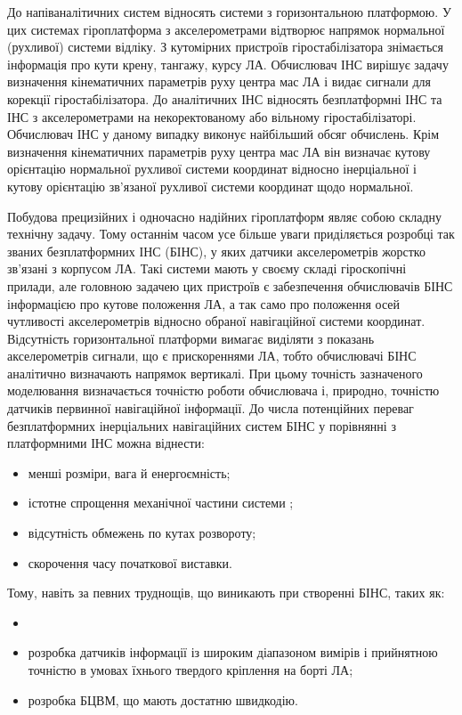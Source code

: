 До напіваналітичних систем відносять системи з горизонтальною платформою. У 
цих системах гіроплатформа з акселерометрами відтворює напрямок нормальної (рухливої) 
системи відліку. З кутомірних пристроїв гіростабілізатора знімається інформація про 
кути крену, тангажу, курсу ЛА. Обчислювач ІНС вирішує задачу визначення кінематичних 
параметрів руху центра мас ЛА і видає сигнали для корекції гіростабілізатора.
До аналітичних ІНС відносять безплатформні ІНС та ІНС з акселерометрами на некоректованому 
або вільному гіростабілізаторі. Обчислювач ІНС у даному випадку виконує найбільший обсяг 
обчислень. Крім визначення кінематичних параметрів руху центра мас ЛА він визначає кутову 
орієнтацію нормальної рухливої системи координат відносно інерціальної і кутову орієнтацію 
зв'язаної рухливої системи координат щодо нормальної. 

Побудова прецизійних і одночасно надійних гіроплатформ являє собою складну технічну задачу. 
Тому останнім часом усе більше уваги приділяється розробці так званих безплатформних ІНС (БІНС), 
у яких датчики акселерометрів жорстко зв’язані з корпусом ЛА. Такі системи мають у своєму складі 
гіроскопічні прилади, але головною задачею цих пристроїв є забезпечення обчислювачів БІНС 
інформацією про кутове положення ЛА, а так само про положення осей чутливості акселерометрів 
відносно обраної навігаційної системи координат. Відсутність горизонтальної платформи вимагає 
виділяти з показань акселерометрів сигнали, що є прискореннями ЛА, тобто обчислювачі БІНС 
аналітично визначають напрямок вертикалі. При цьому точність зазначеного моделювання 
визначається точністю роботи обчислювача і, природно, точністю датчиків первинної навігаційної інформації.
До числа потенційних переваг безплатформних інерціальних навігаційних систем БІНС у 
порівнянні з платформними ІНС можна віднести:

\begin{itemize}
 \item менші розміри, вага й енергоємність;
 \item істотне спрощення механічної частини системи ; 
 \item відсутність обмежень по кутах розвороту;
 \item скорочення часу початкової виставки.
\end{itemize}

Тому, навіть за певних труднощів, що виникають при створенні БІНС, таких як:
\begin{itemize}
 \item 
 \item розробка датчиків інформації із широким діапазоном вимірів і прийнятною точністю в умовах їхнього твердого кріплення на борті ЛА;
 \item розробка БЦВМ, що мають достатню швидкодію.
\end{itemize}

